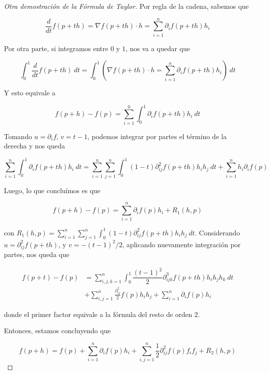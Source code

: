\begin{proof}[Otra demostración de la Fórmula de Taylor]
    Por regla de la cadena, sabemos que
    
    \[
    \frac{d}{dt} f(p + th) = \nabla f(p + th) \cdot h = \sum_{i=1}^n \partial_i f(p + th)h_i
    \]
    
    Por otra parte, si integramos entre $0$ y $1$, nos va a quedar que
    
    \[
    \int_0^1 \frac{d}{dt} f(p + th)~dt = \int_0^1 \left( \nabla f(p + th) \cdot h = \sum_{i=1}^n \partial_i f(p + th)h_i \right)~dt
    \]
    
    Y esto equivale a
    
    \[
    f(p+h) - f(p) = \sum_{i=1}^0 \int_0^1 \partial_i f(p + th)h_i~dt
    \]
    
    Tomando $u = \partial_i f$, $v = t-1$, podemos integrar por partes el término de la derecha y nos queda
    
    \[
    \sum_{i=1}^n \int_0^1 \partial_i f(p + th)h_i~dt = \sum_{i=1}^n \sum_{j=1}^n \int_0^1 (1-t) \partial_{ij}^2 f(p + th) h_ih_j~dt + \sum_{i=1}^n h_i\partial_i f(p)
    \]
    
    Luego, lo que concluímos es que
    
    \[
    f(p + h) - f(p) = \sum_{i=1}^n \partial_i f(p) h_i + R_1(h,p)
    \]
    
    \noindent con $R_1(h, p) = \sum_{i=1}^n \sum_{j=1}^n \int_0^1 (1-t) \partial_{ij}^2 f(p + th) h_ih_j~dt$. Considerando $u = \partial_{ij}^2f(p + th)$, y $v = -(t-1)^2/2$, aplicando nuevamente integración por partes, nos queda que
    
    \begin{align*}
        f(p+t) - f(p) &= \sum_{i,j,k=1}^n \int_0^1 \dfrac{(t-1)^2}{2} \partial_{ijk}^3 f(p + th) h_ih_jh_k~dt \\
            &+ \sum_{i,j=1}^n \frac{\partial_{ij}^2}{2} f(p) h_ih_j + \sum_{i=1}^n \partial_i f(p) h_i
    \end{align*}
    
    \noindent donde el primer factor equivale a la fórmula del resto de orden $2$.
    
    Entonces, estamos concluyendo que
    
    \[
    f(p + h) = f(p) + \sum_{i=1}^n \partial_i f(p) h_i + \sum_{i,j = 1}^n \frac{1}{2} \partial_{ij}^2 f(p) f_i f_j + R_2(h, p)
    \]
    

\end{proof}
